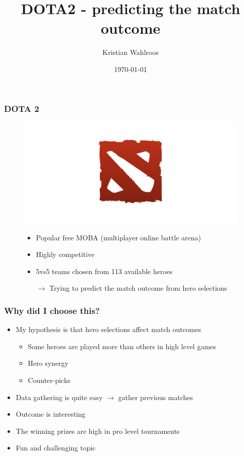 \documentclass[english]{beamer}
\title{DOTA2 - predicting the match outcome}
\institute{University of Helsinki}
\author{Kristian Wahlroos}
\date{\today}
\begin{document}
	\frame{\titlepage}
	
	\begin{frame}
		\frametitle{DOTA 2}
		\begin{figure}[uc]
			\includegraphics[scale=0.25]{dota2}
			\begin{itemize}
				\item Popular free MOBA (multiplayer online battle arena)
				\item Highly competitive
				\item 5vs5 teams chosen from 113 available heroes
				\item[$\rightarrow$] Trying to predict the match outcome from hero selections
			\end{itemize}
		\end{figure}
	\end{frame}
	
	\begin{frame}
		\frametitle{Why did I choose this?}
		\begin{itemize}
			\item My hypothesis is that hero selections affect match outcomes 
			\begin{itemize}
				\item Some heroes are played more than others in high level games
				\item Hero synergy 
				\item Counter-picks
			\end{itemize}
			\item Data gathering is quite easy $\rightarrow$ gather previous matches
			\item Outcome is interesting
			\item The winning prizes are high in pro level tournaments
			\item Fun and challenging topic 
		\end{itemize}
	\end{frame}
	
\end{document}

